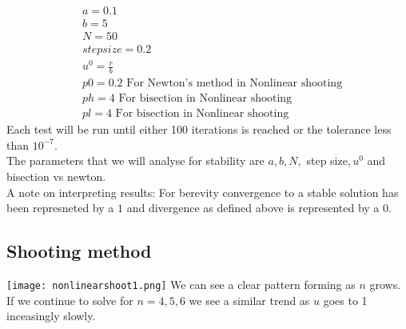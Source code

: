 \documentclass{article}
\begin{document}
\begin{align*}
 & a = 0.1 \\
 & b = 5 \\
 & N = 50 \\
 & step size = 0.2 \\
 & u^0 = \frac{r}{b} \\
 & p0 = 0.2 \text{ \ \ \ \ For Newton's method in Nonlinear   shooting}\\
 & ph = 4 \text{ \ \ \ \ For bisection in Nonlinear shooting}\\
 & pl = 4 \text{ \ \ \ \ For bisection in Nonlinear shooting}
\end{align*}
Each test will be run until either 100 iterations is reached or the tolerance less than $10^{-7}$. \\
The parameters that we will analyse for stability are $a,b,N,$ step size$,u^0$ and bisection vs newton. \\
A note on interpreting results: For berevity convergence to a stable solution has been represneted by a $1$ and divergence as defined above is represented by a $0$.  
\subsection{Shooting method}
\texttt{[image: nonlinearshoot1.png]}
We can see a clear pattern forming as $n$ grows. If we continue to solve for $n=4,5,6$ we see a similar trend as $u$ goes to 1 inceasingly slowly. \\
\end{document}
